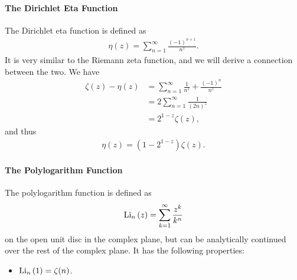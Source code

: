 \paragraph{The Dirichlet Eta Function}
The Dirichlet eta function is defined as
\begin{align*}
	\eta(z) = \sum\limits_{n = 1}^{\infty}\frac{(-1)^{n + 1}}{n^{z}}.
\end{align*}
It is very similar to the Riemann zeta function, and we will derive a connection between the two. We have
\begin{align*}
	\zeta(z) - \eta(z) &= \sum\limits_{n = 1}^{\infty}\frac{1}{n^{z}} + \frac{(-1)^{n}}{n^{z}} \\
	                   &= 2\sum\limits_{n = 1}^{\infty}\frac{1}{(2n)^{z}} \\
	                   &= 2^{1 - z}\zeta(z),
\end{align*}
and thus
\begin{align*}
	\eta(z) = (1 - 2^{1 - z})\zeta(z).
\end{align*}

\paragraph{The Polylogarithm Function}
The polylogarithm function is defined as
\begin{align*}
	\text{Li}_{n}\left(z\right) = \sum\limits_{k = 1}^{\infty}\frac{z^{k}}{k^{n}}
\end{align*}
on the open unit disc in the complex plane, but can be analytically continued over the rest of the complex plane. It has the following properties:
\begin{itemize}
	\item $\text{Li}_{n}\left(1\right) = \zeta(n)$.
\end{itemize}

